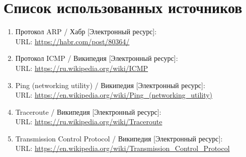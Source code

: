 \section*{Список использованных источников}

\begin{enumerate}
	\item Протокол ARP / Хабр [Электронный ресурс]:\\
		URL: {\small\url{https://habr.com/post/80364/}}
	\item Протокол ICMP / Википедия [Электронный ресурс]:\\
		URL: {\small\url{https://ru.wikipedia.org/wiki/ICMP}}
	\item Ping (networking utility) / Википедия  [Электронный ресурс]:\\
		URL: {\small\url{https://en.wikipedia.org/wiki/Ping_(networking_utility)}}
	\item Traceroute / Википедия [Электронный ресурс]:\\
		URL: {\small\url{https://ru.wikipedia.org/wiki/Traceroute}}
	\item Transmission Control Protocol / Википедия  [Электронный ресурс]:\\
		URL: {\small\url{https://en.wikipedia.org/wiki/Transmission_Control_Protocol}}
\end{enumerate}



